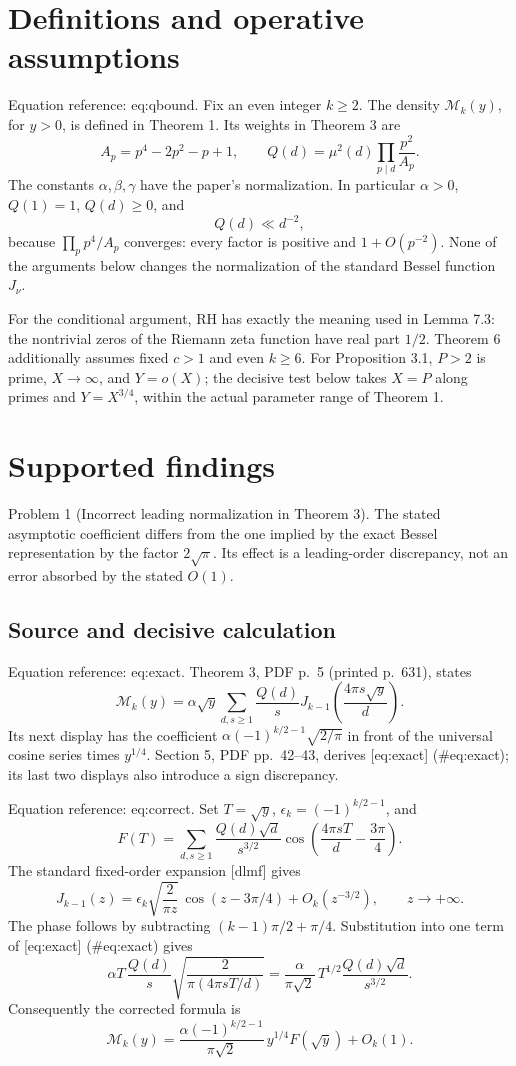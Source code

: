 \documentclass[10pt]{article}
\begin{document}
\section*{Definitions and operative assumptions}
Equation reference: eq:qbound. Fix an even integer \(k\ge2\). The density \(\mathcal M_k(y)\), for \(y>0\), is defined in Theorem 1. Its weights in Theorem 3 are \[A_p=p^4-2p^2-p+1,\qquad
 Q(d)=\mu^2(d)\prod_{p\mid d}\frac{p^2}{A_p}.\] The constants \(\alpha,\beta,\gamma\) have the paper’s normalization. In particular \(\alpha>0\), \(Q(1)=1\), \(Q(d)\ge0\), and \[
 Q(d)\ll d^{-2},\] because \(\prod_p p^4/A_p\) converges: every factor is positive and \(1+O(p^{-2})\). None of the arguments below changes the normalization of the standard Bessel function \(J_\nu\).\par
For the conditional argument, RH has exactly the meaning used in Lemma 7.3: the nontrivial zeros of the Riemann zeta function have real part \(1/2\). Theorem 6 additionally assumes fixed \(c>1\) and even \(k\ge6\). For Proposition 3.1, \(P>2\) is prime, \(X\to\infty\), and \(Y=o(X)\); the decisive test below takes \(X=P\) along primes and \(Y=X^{3/4}\), within the actual parameter range of Theorem 1.\par
\section*{Supported findings}
Problem 1 (Incorrect leading normalization in Theorem 3).  The stated asymptotic coefficient differs from the one implied by the exact Bessel representation by the factor \(2\sqrt{\pi}\). Its effect is a leading-order discrepancy, not an error absorbed by the stated \(O(1)\).\par
\subsection*{Source and decisive calculation}
Equation reference: eq:exact. Theorem 3, PDF p. 5 (printed p. 631), states \[
 \mathcal M_k(y)=\alpha\sqrt y\sum_{d,s\ge1}\frac{Q(d)}s
 J_{k-1}\left(\frac{4\pi s\sqrt y}{d}\right).\] Its next display has the coefficient \(\alpha(-1)^{k/2-1}\sqrt{2/\pi}\) in front of the universal cosine series times \(y^{1/4}\). Section 5, PDF pp. 42–43, derives [eq:exact] (\#eq:exact); its last two displays also introduce a sign discrepancy.\par
Equation reference: eq:correct. Set \(T=\sqrt y\), \(\epsilon_k=(-1)^{k/2-1}\), and \[F(T)=\sum_{d,s\ge1}\frac{Q(d)\sqrt d}{s^{3/2}}
             \cos\left(\frac{4\pi sT}{d}-\frac{3\pi}{4}\right).\] The standard fixed-order expansion [dlmf] gives \[J_{k-1}(z)=\epsilon_k\sqrt{\frac2{\pi z}}\,
              \cos(z-3\pi/4)+O_k(z^{-3/2}),\qquad z\to+\infty.\] The phase follows by subtracting \((k-1)\pi/2+\pi/4\). Substitution into one term of [eq:exact] (\#eq:exact) gives \[\alpha T\,\frac{Q(d)}s\sqrt{\frac2{\pi(4\pi sT/d)}}
 =\frac{\alpha}{\pi\sqrt2}\,T^{1/2}
                 \frac{Q(d)\sqrt d}{s^{3/2}}.\] Consequently the corrected formula is \[
 \boxed{\mathcal M_k(y)=
   \frac{\alpha(-1)^{k/2-1}}{\pi\sqrt2}\,
         y^{1/4}F(\sqrt y)+O_k(1).}\]\par
\end{document}
